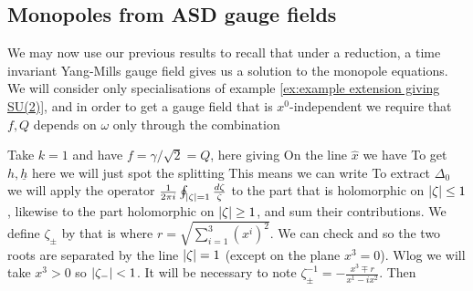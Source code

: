 \documentclass{article}
\begin{document}
\subsection{Monopoles from ASD gauge fields}
We may now use our previous results to recall that under a reduction, a time invariant Yang-Mills gauge field gives us a solution to the monopole equations. We will consider only specialisations of example \ref{ex:example extension giving SU(2)}, and in order to get a gauge field that is $x^0$-independent we require that $f,Q$ depends on $\omega$ only through the combination
\begin{example}
	Take $k=1$ and have $f = \gamma/\sqrt{2} = Q$, here giving 
On the line $\hat{x}$ we have 
To get $h,\underline{h}$ here we will just spot the splitting
This means we can write 
To extract $\Delta_0$ we will apply the operator $\frac{1}{2\pi i} \oint_{\left\lvert \zeta \right\rvert=1} \frac{d\zeta}{\zeta}$ to the part that is holomorphic on $\left\lvert \zeta \right\rvert \leq 1$, likewise to the part holomorphic on $\left\lvert \zeta \right\rvert\geq 1$, and sum their contributions. We define $\zeta_\pm$ by
that is 
where $r = \sqrt{\sum_{i=1}^3 (x^i)^2}$. We can check 
and so the two roots are separated by the line $\left\lvert \zeta \right\rvert=1$ (except on the plane $x^3=0$). Wlog we will take $x^3>0$ so $\left\lvert \zeta_- \right\rvert<1$. It will be necessary to note $\zeta_\pm^{-1} = -\frac{x^3\mp r}{x^1-ix^2}$. Then 

\end{example}
\end{document}
